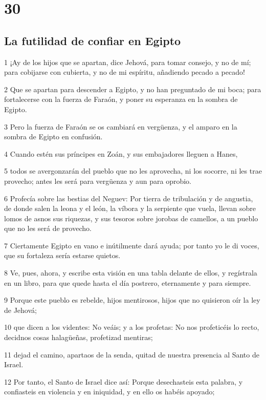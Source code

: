 \chapter{30}

\section*{La futilidad de confiar en Egipto}

\par 1 ¡Ay de los hijos que se apartan, dice Jehová, para tomar consejo, y no de mí; para cobijarse con cubierta, y no de mi espíritu, añadiendo pecado a pecado!
\par 2 Que se apartan para descender a Egipto, y no han preguntado de mi boca; para fortalecerse con la fuerza de Faraón, y poner su esperanza en la sombra de Egipto.
\par 3 Pero la fuerza de Faraón se os cambiará en vergüenza, y el amparo en la sombra de Egipto en confusión.
\par 4 Cuando estén sus príncipes en Zoán, y sus embajadores lleguen a Hanes,
\par 5 todos se avergonzarán del pueblo que no les aprovecha, ni los socorre, ni les trae provecho; antes les será para vergüenza y aun para oprobio.
\par 6 Profecía sobre las bestias del Neguev: Por tierra de tribulación y de angustia, de donde salen la leona y el león, la víbora y la serpiente que vuela, llevan sobre lomos de asnos sus riquezas, y sus tesoros sobre jorobas de camellos, a un pueblo que no les será de provecho.
\par 7 Ciertamente Egipto en vano e inútilmente dará ayuda; por tanto yo le di voces, que su fortaleza sería estarse quietos.
\par 8 Ve, pues, ahora, y escribe esta visión en una tabla delante de ellos, y regístrala en un libro, para que quede hasta el día postrero, eternamente y para siempre.
\par 9 Porque este pueblo es rebelde, hijos mentirosos, hijos que no quisieron oír la ley de Jehová;
\par 10 que dicen a los videntes: No veáis; y a los profetas: No nos profeticéis lo recto, decidnos cosas halagüeñas, profetizad mentiras;
\par 11 dejad el camino, apartaos de la senda, quitad de nuestra presencia al Santo de Israel.
\par 12 Por tanto, el Santo de Israel dice así: Porque desechasteis esta palabra, y confiasteis en violencia y en iniquidad, y en ello os habéis apoyado;
